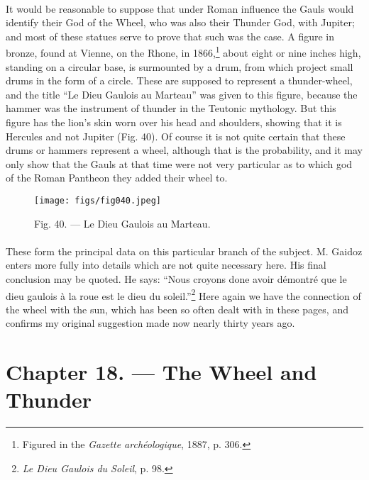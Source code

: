 \documentclass[a4paper, 11pt, oneside, polutonikogreek, english]{article}
\begin{document}
\paragraph{}
It would be reasonable to suppose that under Roman influence the Gauls would identify their God of the Wheel, who was also their Thunder God, with Jupiter; and most of these statues serve to prove that such was the case. A figure in bronze, found at Vienne, on the Rhone, in 1866,\footnote{Figured in the \emph{Gazette archéologique}, 1887, p. 306.} about eight or nine inches high, standing on a circular base, is surmounted by a drum, from which project small drums in the form of a circle. These are supposed to represent a thunder-wheel, and the title ``Le Dieu Gaulois au Marteau'' was given to this figure, because the hammer was the instrument of thunder in the Teutonic mythology. But this figure has the lion's skin worn over his head and shoulders, showing that it is Hercules and not Jupiter (Fig. 40). Of course it is not quite certain that these drums or hammers represent a wheel, although that is the probability, and it may only show that the Gauls at that time were not very particular as to which god of the Roman Pantheon they added their wheel to.

\begin{figure}[H]
\centering
\texttt{[image: figs/fig040.jpeg]}
\caption{Fig. 40. --- Le Dieu Gaulois au Marteau.}
\end{figure}
\paragraph{}
These form the principal data on this particular branch of the subject. M. Gaidoz enters more fully into details which are not quite necessary here. His final conclusion may be quoted. He says: ``Nous croyons done avoir démontré que le dieu gaulois à la roue est le dieu du soleil.''\footnote{\emph{Le Dieu Gaulois du Soleil}, p. 98.} Here again we have the connection of the wheel with the sun, which has been so often dealt with in these pages, and confirms my original suggestion made now nearly thirty years ago.
\clearpage
\section{Chapter 18. --- The Wheel and Thunder}
\end{document}
